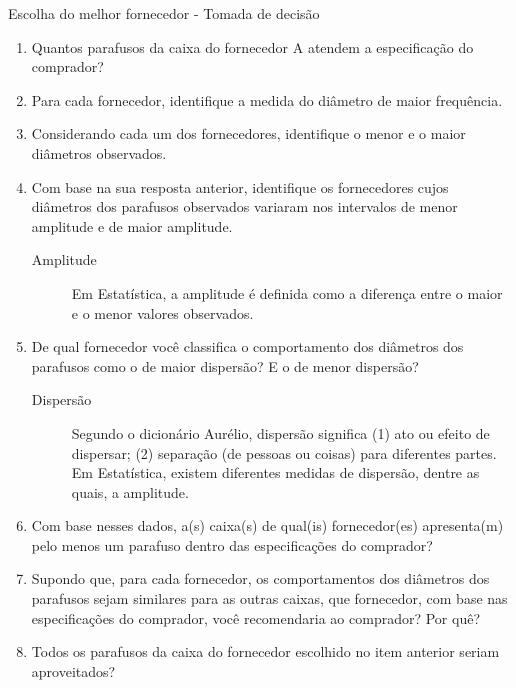\begin{task}{Escolha do melhor fornecedor - Tomada de decisão}
\begin{enumerate}
\item {} 
Quantos parafusos da caixa do fornecedor A atendem a especificação do comprador?

\item {} 
Para cada fornecedor, identifique a medida do diâmetro de maior frequência.

\item {} 
Considerando cada um dos fornecedores, identifique o menor e o maior diâmetros observados.

\item {} 
Com base na sua resposta anterior, identifique os fornecedores cujos diâmetros dos parafusos observados variaram nos intervalos de menor amplitude e de maior amplitude.


\begin{description}
\item[{Amplitude}] \leavevmode{}\label{est1-def-2}
Em Estatística, a amplitude é definida como a diferença entre o maior e o menor valores observados.

\end{description}

\item De qual fornecedor você classifica o comportamento dos diâmetros dos parafusos como o de maior    dispersão? E o de menor dispersão?
\begin{description}
\item[{Dispersão}] \leavevmode{}\label{est1-def-3}
Segundo o dicionário Aurélio, dispersão significa (1) ato ou efeito de dispersar; (2) separação (de pessoas ou coisas) para diferentes partes.  Em Estatística, existem diferentes medidas de dispersão, dentre as quais, a amplitude.

\end{description}

\item Com base nesses dados, a(s) caixa(s) de qual(is)  fornecedor(es) apresenta(m) pelo menos um parafuso dentro das especificações do comprador?

\item Supondo que, para cada fornecedor, os comportamentos dos diâmetros dos parafusos sejam similares para as outras caixas, que fornecedor, com base nas especificações do comprador, você recomendaria ao comprador? Por quê?

\item Todos os parafusos da caixa do fornecedor escolhido no item anterior seriam aproveitados?
\end{enumerate}

\end{task}


